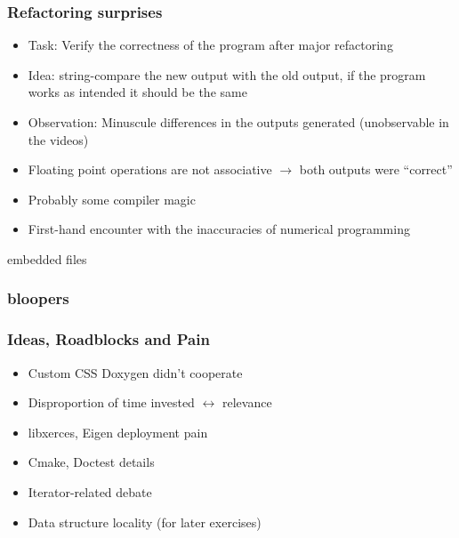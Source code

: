 \begin{frame}
    \frametitle{Refactoring surprises}
		\large
		\begin{itemize}
			\item<1-> Task: Verify the correctness of the program after major refactoring
			\item<2-> Idea: string-compare the new output with the old output, if the program works as intended it should be the same
			\item<3-> Observation: Minuscule differences in the outputs generated (unobservable in the videos)
		\end{itemize}
		\begin{itemize}
			\item<5-> Floating point operations are not associative $\rightarrow$ both outputs were ``correct''
			\item<6-> Probably some compiler magic
			\item<7-> First-hand encounter with the inaccuracies of numerical programming
		\end{itemize}

\end{frame}
\clearpage

\begin{frame}{embedded files}
	\frametitle{bloopers}
\end{frame}

\begin{frame}
	\frametitle{Ideas, Roadblocks and Pain}
	\large
	\begin{itemize}
		\item<1-> Custom CSS Doxygen didn't cooperate
		\item<2-> Disproportion of time invested $\leftrightarrow$ relevance
		\item<3-> libxerces, Eigen deployment pain
		\item<4-> Cmake, Doctest details
		\item<5-> Iterator-related debate
		\item<6-> Data structure locality (for later exercises)
	\end{itemize}
	
\end{frame}